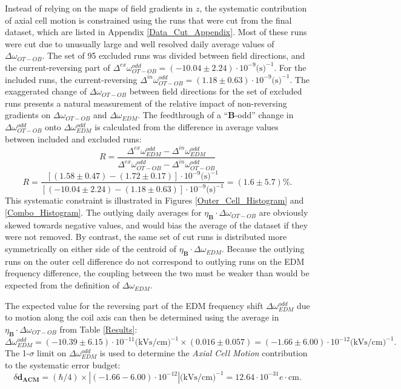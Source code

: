 \documentclass [10pt, twoside] {uwthesis}[2012/04/02]
\begin{document}
Instead of relying on the maps of field gradients in $z$, the systematic contribution of axial cell motion is constrained using the runs that were cut from the final dataset, which are listed in Appendix \ref{Data_Cut_Appendix}. Most of these runs were cut due to unusually large and well resolved daily average values of $\Delta\omega_{OT-OB}$. The set of 95 excluded runs was divided between field directions, and the current-reversing part of $\Delta^{ex}\omega^{odd}_{OT-OB} = (-10.04\pm2.24)\cdot 10^{-9} \text{(s)}^{-1}$. For the included runs, the current-reversing $\Delta^{in}\omega^{odd}_{OT-OB} = (1.18\pm0.63)\cdot 10^{-9} \text{(s)}^{-1}$. The exaggerated change of $\Delta\omega_{OT-OB}$ between field directions for the set of excluded runs presents a natural measurement of the relative impact of non-reversing gradients on $\Delta\omega_{OT-OB}$ and $\Delta\omega_{EDM}$. The feedthrough of a ``$\mathbf{B}$-odd'' change in $\Delta\omega^{odd}_{OT-OB}$ onto $\Delta\omega^{odd}_{EDM}$ is calculated from the difference in average values between included and excluded runs:
\begin{equation}
R =\dfrac{\Delta^{ex}\omega^{odd}_{EDM} - \Delta^{in}\omega^{odd}_{EDM}}{\Delta^{ex}\omega^{odd}_{OT-OB} - \Delta^{in}\omega^{odd}_{OT-OB}}
\end{equation}
\begin{equation}
R =\dfrac{[(1.58\pm0.47) - (1.72\pm0.17)]\cdot 10^{-9} \text{(s)}^{-1}}{[(-10.04\pm2.24) - (1.18\pm0.63)]\cdot 10^{-9} \text{(s)}^{-1}} = (1.6\pm5.7)\text{\%}.
\end{equation}
This systematic constraint is illustrated in Figures \ref{Outer_Cell_Histogram} and \ref{Combo_Histogram}. The outlying daily averages for $\eta_{\mathbf{B}}\cdot\Delta\omega_{OT-OB}$ are obviously skewed towards negative values, and would bias the average of the dataset if they were not removed. By contrast, the same set of cut runs is distributed more symmetrically on either side of the centroid of $\eta_{\mathbf{B}}\cdot\Delta\omega_{EDM}$. Because the outlying runs on the outer cell difference do not correspond to outlying runs on the EDM frequency difference, the coupling between the two must be weaker than would be expected from the definition of $\Delta\omega_{EDM}$. 

The expected value for the reversing part of the EDM frequency shift $\Delta\omega^{odd}_{EDM}$ due to motion along the coil axis can then be determined using the average in $\eta_{\mathbf{B}}\cdot\Delta\omega_{OT-OB}$ from Table \ref{Results}:
\begin{equation}
\Delta\omega^{odd}_{EDM} = (-10.39 \pm 6.15)\cdot 10^{-11}\text{(kVs/cm)}^{-1} \times (0.016 \pm 0.057) = (-1.66 \pm 6.00)\cdot 10^{-12}\text{(kVs/cm)}^{-1}.
\end{equation}
The 1-$\sigma$ limit on $\Delta\omega^{odd}_{EDM}$ is used to determine the \textit{Axial Cell Motion} contribution to the systematic error budget:
\begin{equation}
\delta\mathbf{d_{ACM}} = (\hbar/4)\times |(-1.66 - 6.00)\cdot 10^{-12}|\text{(kVs/cm)}^{-1} = 12.64\cdot 10^{-31} e\cdot \text{cm}.
\end{equation} 
\end{document}
